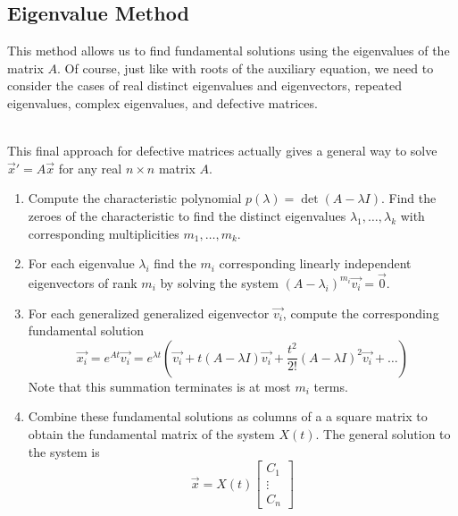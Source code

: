 \subsection{Eigenvalue Method}
\noindent
This method allows us to find fundamental solutions using the eigenvalues of the matrix $A$.
Of course, just like with roots of the auxiliary equation, we need to consider the cases of real distinct eigenvalues and eigenvectors, repeated eigenvalues, complex eigenvalues, and defective matrices. 




\\

\noindent
This final approach for defective matrices actually gives a general way to solve $\vec{x}' = A\vec{x}$ for any real $n \times n$ matrix $A$.
\begin{enumerate}[label = \arabic*)]
	\item
		Compute the characteristic polynomial $p(\lambda) = \det{(A - \lambda I)}$. Find the zeroes of the characteristic to find the distinct eigenvalues $\lambda_1, \ldots, \lambda_k$ with corresponding multiplicities $m_1, \ldots, m_k$.
	\item
		For each eigenvalue $\lambda_i$ find the $m_i$ corresponding linearly independent eigenvectors of rank $m_i$ by solving the system $(A - \lambda_i)^{m_i}\vec{v_i} = \vec{0}$.
	\item
		For each generalized generalized eigenvector $\vec{v_i}$, compute the corresponding fundamental solution
		\begin{equation*}
			\vec{x_i} = e^{At}\vec{v_i} = e^{\lambda t}\left(\vec{v_i} + t(A - \lambda I)\vec{v_i} + \frac{t^2}{2!}(A - \lambda I)^2\vec{v_i} + \ldots\right)
		\end{equation*}
		Note that this summation terminates is at most $m_i$ terms.
	\item
		Combine these fundamental solutions as columns of a a square matrix to obtain the fundamental matrix of the system $X(t)$. The general solution to the system is
		\begin{equation*}
			\vec{x} = X(t)\begin{bmatrix}
				C_1 \\
				\vdots \\
				C_n
			\end{bmatrix}
		\end{equation*}
\end{enumerate}